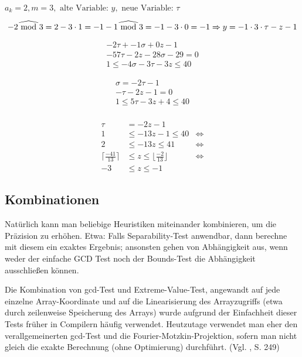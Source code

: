 \( a_k = 2, m=3, \text{ alte Variable: } y, \text{ neue Variable: } \tau \)

\[ 
-2 \widehat{\textrm{\ mod\ }} 3 = 2 - 3 \cdot 1 = -1 \\
-1 \widehat{\textrm{\ mod\ }} 3 = -1 -3 \cdot 0 = -1 \\
\Rightarrow y = -1 \cdot 3 \cdot \tau - z - 1
\]

\begin{align}
-2 \tau + -1 \sigma + 0 z - 1\\
-57 \tau - 2 z - 28 \sigma - 29 = 0 \\
1 \leq -4 \sigma - 3 \tau - 3 z \leq 40
\end{align}

\begin{align}
\sigma = -2 \tau - 1 \\
- \tau - 2z - 1 = 0 \\
1 \leq 5 \tau - 3 z + 4 \leq 40 \\
\end{align}

\begin{align}
 \tau & = -2z -1  & \\
1      & \leq -13z - 1  \leq 40 & \Leftrightarrow \\
2      & \leq -13z       \leq 41 & \Leftrightarrow \\
\lceil \frac{-41}{13} \rceil & \leq z  \leq \lfloor \frac{-2}{13} \rfloor & \Leftrightarrow \\
-3 & \leq z  \leq -1 &
\end{align}






\subsection{Kombinationen}

Natürlich kann man beliebige Heuristiken miteinander kombinieren, um
die Präzision zu erhöhen. Etwa: Falls Separability-Test anwendbar,
dann berechne mit diesem ein exaktes Ergebnis; ansonsten gehen von
Abhängigkeit aus, wenn weder der einfache GCD Test noch der
Bounds-Test die Abhängigkeit ausschließen können.

Die Kombination von gcd-Test und Extreme-Value-Test, angewandt auf jede
einzelne Array-Koordinate und auf die Linearisierung des Arrayzugriffs
(etwa durch zeilenweise Speicherung des Arrays) wurde aufgrund der
Einfachheit dieser Tests früher in Compilern häufig
verwendet. Heutzutage verwendet man eher den verallgemeinerten gcd-Test
und die Fourier-Motzkin-Projektion, sofern man nicht gleich die exakte
Berechnung (ohne Optimierung) durchführt. (Vgl. \cite{Wol95}, S. 249)



\def\ins{\hspace{.5cm}}
